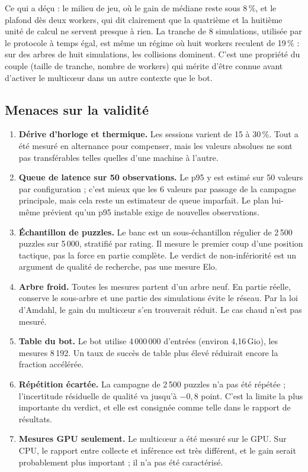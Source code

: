 Ce qui a d\'e\c{c}u : le milieu de jeu, o\`u le gain de m\'ediane reste sous
8\,\%, et le plafond d\`es deux workers, qui dit clairement que la
quatri\`eme et la huiti\`eme unit\'e de calcul ne servent presque \`a rien. La
tranche de 8 simulations, utilis\'ee par le protocole \`a temps \'egal, est
m\^eme un r\'egime o\`u huit workers reculent de 19\,\% : sur des arbres de
huit simulations, les collisions dominent. C'est une propri\'et\'e du couple
(taille de tranche, nombre de workers) qui m\'erite d'\^etre connue avant
d'activer le multic\oe{}ur dans un autre contexte que le bot.

\subsection{Menaces sur la validit\'e}

\begin{enumerate}[leftmargin=1.4em]
  \item \textbf{D\'erive d'horloge et thermique.} Les sessions varient de 15
  \`a 30\,\%. Tout a \'et\'e mesur\'e en alternance pour compenser, mais les
  valeurs absolues ne sont pas transf\'erables telles quelles d'une machine
  \`a l'autre.
  \item \textbf{Queue de latence sur 50 observations.} Le p95 y est estim\'e
  sur 50 valeurs par configuration ; c'est mieux que les 6 valeurs par
  passage de la campagne principale, mais cela reste un estimateur de queue
  imparfait. Le plan lui-m\^eme pr\'evient qu'un p95 instable exige de
  nouvelles observations.
  \item \textbf{\'Echantillon de puzzles.} Le banc est un sous-\'echantillon
  r\'egulier de 2\,500 puzzles sur 5\,000, stratifi\'e par rating. Il mesure
  le premier coup d'une position tactique, pas la force en partie compl\`ete.
  Le verdict de non-inf\'eriorit\'e est un argument de qualit\'e de recherche,
  pas une mesure Elo.
  \item \textbf{Arbre froid.} Toutes les mesures partent d'un arbre neuf. En
  partie r\'eelle,  conserve le sous-arbre et une partie
  des simulations \'evite le r\'eseau. Par la loi d'Amdahl, le gain du
  multic\oe{}ur s'en trouverait r\'eduit. Le cas chaud n'est pas mesur\'e.
  \item \textbf{Table du bot.} Le bot utilise 4\,000\,000 d'entr\'ees (environ
  4,16\,Gio), les mesures 8\,192. Un taux de succ\`es de table plus \'elev\'e
  r\'eduirait encore la fraction acc\'el\'er\'ee.
  \item \textbf{R\'ep\'etition \'ecart\'ee.} La campagne de 2\,500 puzzles n'a
  pas \'et\'e r\'ep\'et\'ee ; l'incertitude r\'esiduelle de qualit\'e va
  jusqu'\`a $-0,8$ point. C'est la limite la plus importante du verdict, et
  elle est consign\'ee comme telle dans le rapport de r\'esultats.
  \item \textbf{Mesures GPU seulement.} Le multic\oe{}ur a \'et\'e mesur\'e
  sur le GPU. Sur CPU, le rapport entre collecte et inf\'erence est tr\`es
  diff\'erent, et le gain serait probablement plus important ; il n'a pas
  \'et\'e caract\'eris\'e.
\end{enumerate}

